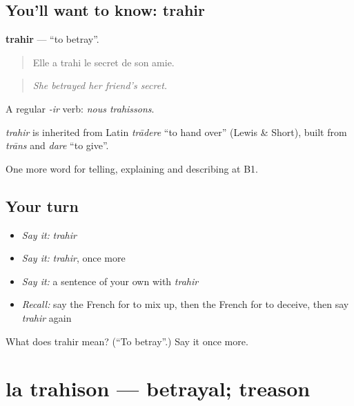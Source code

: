 \subsection*{You'll want to know: trahir}
\textbf{trahir} — \textquotedblleft{}to betray\textquotedblright{}.

\begin{quote}
Elle a trahi le secret de son amie.
\end{quote}

\begin{quote}
\emph{She betrayed her friend's secret.}
\end{quote}

A regular \emph{-ir} verb: \emph{nous trahissons}.

\begin{cousinweb}
\emph{trahir} is inherited from Latin \emph{trādere} \textquotedblleft{}to hand over\textquotedblright{} (Lewis \& Short), built from \emph{trāns} and \emph{dare} \textquotedblleft{}to give\textquotedblright{}.
\end{cousinweb}

\begin{grammarlens}[title={What you've built}]
One more word for telling, explaining and describing at B1.
\end{grammarlens}

\subsection*{Your turn}
\begin{itemize}
\raggedright
  \item \emph{Say it:} \emph{trahir}
  \item \emph{Say it:} \emph{trahir}, once more
  \item \emph{Say it:} a sentence of your own with \emph{trahir}
  \item \emph{Recall:} say the French for to mix up, then the French for to deceive, then say \emph{trahir} again
\end{itemize}

\begin{tcolorbox}[breakable,colback=teal!4,colframe=teal!35!black,title={Before you move on}]
What does trahir mean? (\textquotedblleft{}To betray\textquotedblright{}.) Say it once more.
\end{tcolorbox}
\section[la trahison]{la trahison — betrayal; treason}

